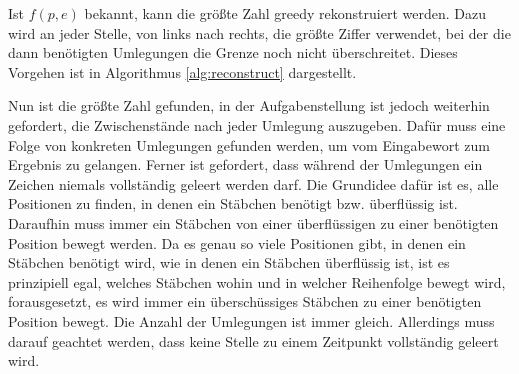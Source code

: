 \documentclass[a4paper,10pt,ngerman]{scrartcl}
\begin{document}
Ist $f(p, e)$ bekannt, kann die größte Zahl greedy rekonstruiert werden. Dazu wird an jeder Stelle, von links nach rechts, die größte Ziffer verwendet, bei der die dann benötigten Umlegungen die Grenze noch nicht überschreitet. Dieses Vorgehen ist in Algorithmus \ref{alg:reconstruct} dargestellt.
Nun ist die größte Zahl gefunden, in der Aufgabenstellung ist jedoch weiterhin gefordert, die Zwischenstände nach jeder Umlegung auszugeben.
Dafür muss eine Folge von konkreten Umlegungen gefunden werden, um vom Eingabewort zum Ergebnis zu gelangen. 
Ferner ist gefordert, dass während der Umlegungen ein Zeichen niemals vollständig geleert werden darf. 
Die Grundidee dafür ist es, alle Positionen zu finden, in denen ein Stäbchen benötigt bzw. überflüssig ist. 
Daraufhin muss immer ein Stäbchen von einer überflüssigen zu einer benötigten Position bewegt werden. 
Da es genau so viele Positionen gibt, in denen ein Stäbchen benötigt wird, wie in denen ein Stäbchen überflüssig ist, ist es prinzipiell egal, welches Stäbchen wohin und in welcher Reihenfolge bewegt wird, forausgesetzt, es wird immer ein überschüssiges Stäbchen zu einer benötigten Position bewegt.
Die Anzahl der Umlegungen ist immer gleich. 
Allerdings muss darauf geachtet werden, dass keine Stelle zu einem Zeitpunkt vollständig geleert wird. 
\end{document}

